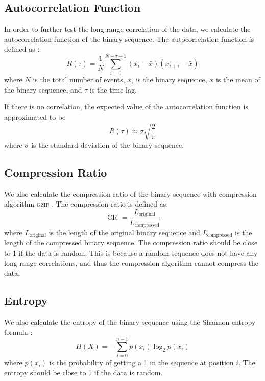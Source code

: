 \subsection{Autocorrelation Function}
In order to further test the long-range correlation of the data, we calculate the autocorrelation function of the binary sequence. The autocorrelation function is defined as \cite{brockwell1991timeseries}:
\begin{equation}
R(\tau) = \frac{1}{N} \sum_{i=0}^{N-\tau-1} (x_i - \bar{x})(x_{i+\tau} - \bar{x})
\end{equation}
where $N$ is the total number of events, $x_i$ is the binary sequence, $\bar{x}$ is the mean of the binary sequence, and $\tau$ is the time lag. 

If there is no correlation, the expected value of the autocorrelation function is approximated to be
\begin{equation}
R(\tau) \approx \sigma \sqrt{\frac{2}{\pi}}
\end{equation}
where $\sigma$ is the standard deviation of the binary sequence. 

\subsection{Compression Ratio}
We also calculate the compression ratio of the binary sequence with compression algorithm \textsc{gzip} \cite{gzip}. The compression ratio is defined as:
\begin{equation}
\operatorname{CR} = \frac{L_{\text{original}}}{L_{\text{compressed}}}
\end{equation}
where $L_\text{original}$ is the length of the original binary sequence and $L_\text{compressed}$ is the length of the compressed binary sequence. The compression ratio should be close to 1 if the data is random. This is because a random sequence does not have any long-range correlations, and thus the compression algorithm cannot compress the data. 

\subsection{Entropy}
We also calculate the entropy of the binary sequence using the Shannon entropy formula \cite{shannon1948mathematical}:
\begin{equation}
H(X) = -\sum_{i=0}^{n-1} p(x_i) \log_2 p(x_i)
\end{equation}
where $p(x_i)$ is the probability of getting a 1 in the sequence at position $i$. The entropy should be close to 1 if the data is random. 


